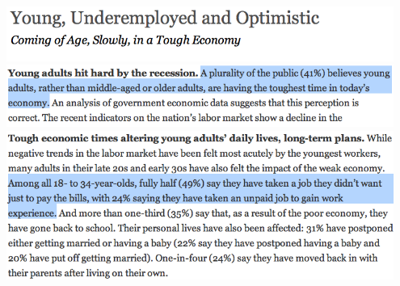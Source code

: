 \begin{frame}
\frametitle{}

\begin{center}
\includegraphics[width=0.95\textwidth]{4-1_var_in_est/pew1.png} \\
\includegraphics[width=0.95\textwidth]{4-1_var_in_est/pew2.png} \\
\includegraphics[width=0.95\textwidth]{4-1_var_in_est/pew3.png}
\end{center}


\end{frame}




